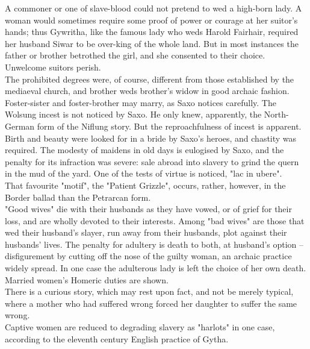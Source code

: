 \documentclass[10pt,a4paper]{report}
\begin{document}
A commoner or one of slave-blood could not pretend to wed a high-born lady. A woman would sometimes require some proof of power or courage at her suitor's hands; thus Gywritha, like the famous lady who weds Harold Fairhair, required her husband Siwar to be over-king of the whole land. But in most instances the father or brother betrothed the girl, and she consented to their choice. Unwelcome suitors perish.\\

The prohibited degrees were, of course, different from those established by the mediaeval church, and brother weds brother's widow in good archaic fashion. Foster-sister and foster-brother may marry, as Saxo notices carefully. The Wolsung incest is not noticed by Saxo. He only knew, apparently, the North-German form of the Niflung story. But the reproachfulness of incest is apparent.\\

Birth and beauty were looked for in a bride by Saxo's heroes, and chastity was required. The modesty of maidens in old days is eulogised by Saxo, and the penalty for its infraction was severe: sale abroad into slavery to grind the quern in the mud of the yard. One of the tests of virtue is noticed, "lac in ubere".\\

That favourite "motif", the "Patient Grizzle", occurs, rather, however, in the Border ballad than the Petrarcan form.\\

"Good wives" die with their husbands as they have vowed, or of grief for their loss, and are wholly devoted to their interests. Among "bad wives" are those that wed their husband's slayer, run away from their husbands, plot against their husbands' lives. The penalty for adultery is death to both, at husband's option -- disfigurement by cutting off the nose of the guilty woman, an archaic practice widely spread. In one case the adulterous lady is left the choice of her own death. Married women's Homeric duties are shown.\\

There is a curious story, which may rest upon fact, and not be merely typical, where a mother who had suffered wrong forced her daughter to suffer the same wrong.\\

Captive women are reduced to degrading slavery as "harlots" in one case, according to the eleventh century English practice of Gytha.\\
\end{document}
